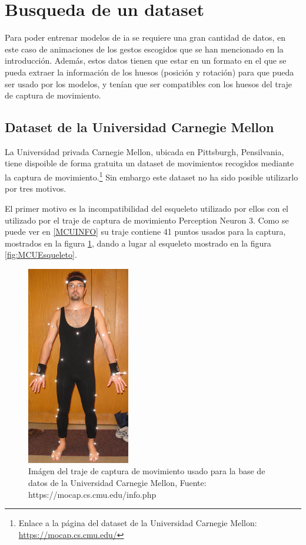 \section{Busqueda de un dataset}
\label{sec:busquedaDataset}
Para poder entrenar modelos de \gls{ia} se requiere una gran cantidad de datos, en este caso de animaciones de los gestos escogidos que se han mencionado en la introducción. 
Además, estos datos tienen que estar en un formato en el que se pueda extraer la información de los huesos (posición y rotación) para que pueda ser usado por los modelos, y tenían que ser compatibles con los huesos del traje de captura de movimiento.

\subsection{Dataset de la Universidad Carnegie Mellon}
La Universidad privada Carnegie Mellon, ubicada en Pittsburgh, Pensilvania, tiene dispoible de forma gratuita un dataset de movimientos recogidos mediante la captura de movimiento.\footnote{Enlace a la página del dataset de la Universidad Carnegie Mellon: \url{https://mocap.cs.cmu.edu/}}
Sin embargo este dataset no ha sido posible utilizarlo por tres motivos.

El primer motivo es la incompatibilidad del esqueleto utilizado por ellos con el utilizado por el traje de captura de movimiento Perception Neuron 3.
Como se puede ver en \ref{MCUINFO} su traje contiene 41 puntos usados para la captura, mostrados en la figura \ref{fig:MCUTraje}, dando a lugar al esqueleto mostrado en la figura \ref{fig:MCUEsqueleto}.

\begin{figure}[H]
    \centering
    \includegraphics[width=0.4\textwidth]{Imagenes/Bitmap/MCUTraje.jpg}
    \caption{Imágen del traje de captura de movimiento usado para la base de datos de la Universidad Carnegie Mellon, Fuente: https://mocap.cs.cmu.edu/info.php}
    \label{fig:MCUTraje}
\end{figure}

